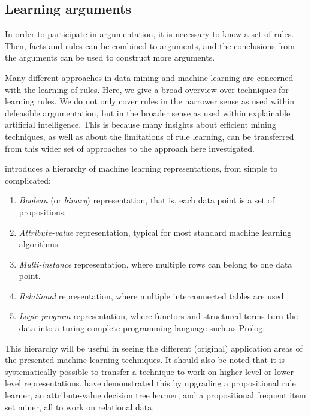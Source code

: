 \subsection{Learning arguments}

In order to participate in argumentation, it is necessary to know a set of rules. Then, facts and rules can be combined to arguments, and the conclusions from the arguments can be used to construct more arguments.

Many different approaches in data mining and machine learning are concerned with the learning of rules. Here, we give a broad overview over techniques for learning rules. We do not only cover rules in the narrower sense as used within defeasible argumentation, but in the broader sense as used within explainable artificial intelligence. This is because many insights about efficient mining techniques, as well as about the limitations of rule learning, can be transferred from this wider set of approaches to the approach here investigated. 

\citet{deraedtLogicalRelationalLearning2008} introduces a hierarchy of machine learning representations, from simple to complicated:

\begin{enumerate}
\item \textit{Boolean} (or \textit{binary}) representation, that is, each data point is a set of propositions.
\item \textit{Attribute-value} representation, typical for most standard machine learning algorithms.
\item \textit{Multi-instance} representation, where multiple rows can belong to one data point.
\item \textit{Relational} representation, where multiple interconnected tables are used.
\item \textit{Logic program} representation, where functors and structured terms turn the data into a turing-complete programming language such as Prolog. 
\end{enumerate}

This hierarchy will be useful in seeing the different (original) application areas of the presented machine learning techniques. It should also be noted that it is systematically possible to transfer a technique to work on higher-level or lower-level representations. \citet[ch.~6]{deraedtLogicalRelationalLearning2008} have demonstrated this by upgrading a propositional rule learner, an attribute-value decision tree learner, and a propositional frequent item set miner, all to work on relational data.

